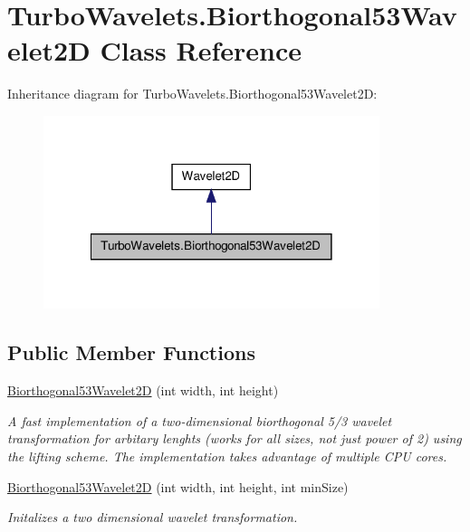 \hypertarget{class_turbo_wavelets_1_1_biorthogonal53_wavelet2_d}{\section{\-Turbo\-Wavelets.\-Biorthogonal53\-Wavelet2\-D \-Class \-Reference}
\label{class_turbo_wavelets_1_1_biorthogonal53_wavelet2_d}
}


\-Inheritance diagram for \-Turbo\-Wavelets.\-Biorthogonal53\-Wavelet2\-D\-:
\nopagebreak
\begin{figure}[H]
\begin{center}
\leavevmode
\includegraphics[width=278pt]{class_turbo_wavelets_1_1_biorthogonal53_wavelet2_d__inherit__graph}
\end{center}
\end{figure}
\subsection*{\-Public \-Member \-Functions}
\begin{DoxyCompactItemize}
\item 
\hyperlink{class_turbo_wavelets_1_1_biorthogonal53_wavelet2_d_a8783eb5b8e032cd8cf75c5a1bb80bba0}{\-Biorthogonal53\-Wavelet2\-D} (int width, int height)
\begin{DoxyCompactList}\small\item\em \-A fast implementation of a two-\/dimensional biorthogonal 5/3 wavelet transformation for arbitary lenghts (works for all sizes, not just power of 2) using the lifting scheme. \-The implementation takes advantage of multiple \-C\-P\-U cores. \end{DoxyCompactList}\item 
\hyperlink{class_turbo_wavelets_1_1_biorthogonal53_wavelet2_d_a2d9bf97c2211d5859b3a53835bea7888}{\-Biorthogonal53\-Wavelet2\-D} (int width, int height, int min\-Size)
\begin{DoxyCompactList}\small\item\em \-Initalizes a two dimensional wavelet transformation. \end{DoxyCompactList}\end{DoxyCompactItemize}


